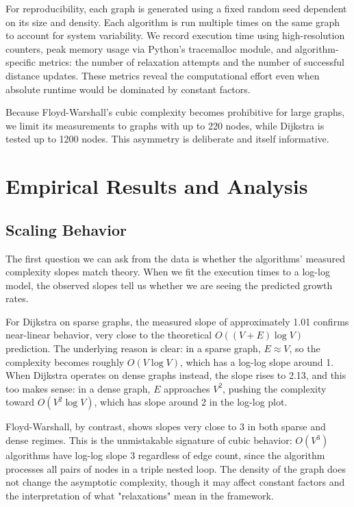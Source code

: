 \documentclass{labreport}
\begin{document}
For reproducibility, each graph is generated using a fixed random seed dependent on its size and density. Each algorithm is run multiple times on the same graph to account for system variability. We record execution time using high-resolution counters, peak memory usage via Python's tracemalloc module, and algorithm-specific metrics: the number of relaxation attempts and the number of successful distance updates. These metrics reveal the computational effort even when absolute runtime would be dominated by constant factors.

Because Floyd-Warshall's cubic complexity becomes prohibitive for large graphs, we limit its measurements to graphs with up to 220 nodes, while Dijkstra is tested up to 1200 nodes. This asymmetry is deliberate and itself informative.

\section{Empirical Results and Analysis}

\subsection{Scaling Behavior}

The first question we can ask from the data is whether the algorithms' measured complexity slopes match theory. When we fit the execution times to a log-log model, the observed slopes tell us whether we are seeing the predicted growth rates.



For Dijkstra on sparse graphs, the measured slope of approximately 1.01 confirms near-linear behavior, very close to the theoretical $O((V+E) \log V)$ prediction. The underlying reason is clear: in a sparse graph, $E \approx V$, so the complexity becomes roughly $O(V \log V)$, which has a log-log slope around 1. When Dijkstra operates on dense graphs instead, the slope rises to 2.13, and this too makes sense: in a dense graph, $E$ approaches $V^2$, pushing the complexity toward $O(V^2 \log V)$, which has slope around 2 in the log-log plot.

Floyd-Warshall, by contrast, shows slopes very close to 3 in both sparse and dense regimes. This is the unmistakable signature of cubic behavior: $O(V^3)$ algorithms have log-log slope 3 regardless of edge count, since the algorithm processes all pairs of nodes in a triple nested loop. The density of the graph does not change the asymptotic complexity, though it may affect constant factors and the interpretation of what "relaxations" mean in the framework.
\end{document}
